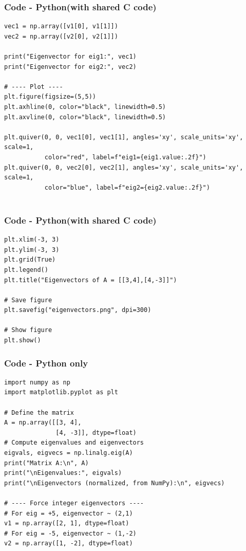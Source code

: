 \documentclass{beamer}
\theoremstyle{remark}
\numberwithin{equation}{section}
\begin{document}
\begin{frame}[fragile]
\frametitle{Code - Python(with shared C code)}
\begin{lstlisting}
vec1 = np.array([v1[0], v1[1]])
vec2 = np.array([v2[0], v2[1]])

print("Eigenvector for eig1:", vec1)
print("Eigenvector for eig2:", vec2)

# ---- Plot ----
plt.figure(figsize=(5,5))
plt.axhline(0, color="black", linewidth=0.5)
plt.axvline(0, color="black", linewidth=0.5)

plt.quiver(0, 0, vec1[0], vec1[1], angles='xy', scale_units='xy', scale=1,
           color="red", label=f"eig1={eig1.value:.2f}")
plt.quiver(0, 0, vec2[0], vec2[1], angles='xy', scale_units='xy', scale=1,
           color="blue", label=f"eig2={eig2.value:.2f}")


\end{lstlisting}
\end{frame}

\begin{frame}[fragile]
\frametitle{Code - Python(with shared C code)}
\begin{lstlisting}
plt.xlim(-3, 3)
plt.ylim(-3, 3)
plt.grid(True)
plt.legend()
plt.title("Eigenvectors of A = [[3,4],[4,-3]]")

# Save figure
plt.savefig("eigenvectors.png", dpi=300)

# Show figure
plt.show()

\end{lstlisting}
\end{frame}



\begin{frame}[fragile]
\frametitle{Code - Python only}
\begin{lstlisting}
import numpy as np
import matplotlib.pyplot as plt

# Define the matrix
A = np.array([[3, 4],
              [4, -3]], dtype=float)
# Compute eigenvalues and eigenvectors
eigvals, eigvecs = np.linalg.eig(A)
print("Matrix A:\n", A)
print("\nEigenvalues:", eigvals)
print("\nEigenvectors (normalized, from NumPy):\n", eigvecs)

# ---- Force integer eigenvectors ----
# For eig = +5, eigenvector ~ (2,1)
v1 = np.array([2, 1], dtype=float)
# For eig = -5, eigenvector ~ (1,-2)
v2 = np.array([1, -2], dtype=float)




\end{lstlisting}
\end{frame}
\end{document}
